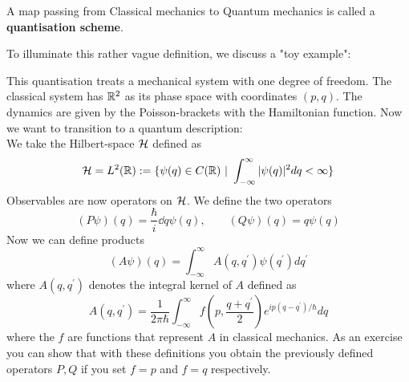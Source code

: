 \begin{definition}
  A map passing from Classical mechanics to Quantum mechanics is called a \textbf{quantisation scheme}.
\end{definition}

To illuminate this rather vague definition, we discuss a "toy example":

\begin{example}
  This quantisation treats a mechanical system with one degree of freedom. The classical system has $\mathbb{R}^2$ as its phase space with coordinates $(p,q)$. The dynamics are given by the Poisson-brackets with the Hamiltonian function. Now we want to transition to a quantum description:\\

  We take the Hilbert-space ${\mathcal{H}}$ defined as
  $$ {\mathcal{H}} = L^2(\mathbb{R}) := \{ \psi(q) \in C(\mathbb{R}) \ | \ \int_{-\infty}^\infty |\psi(q)|^2 dq < \infty  \} $$
  Observables are now operators on ${\mathcal{H}}$. We define the two operators
  $$ (P\psi)(q) = \frac{\hbar}{i} \dd{}{q} \psi(q), \quad \quad (Q\psi)(q) = q \psi(q) $$
  Now we can define products
  $$ (A\psi)(q) = \int_{-\infty}^\infty A(q,q^\prime) \psi(q^\prime) dq^\prime $$
  where $A(q,q^\prime)$ denotes the integral kernel of $A$ defined as
  $$ A(q,q^\prime) = \frac{1}{2 \pi \hbar} \int_{-\infty}^\infty f\left( p, \frac{q+q^\prime}{2} \right) e^{ip(q-q^\prime)/\hbar} dq $$
  where the $f$ are functions that represent $A$ in classical mechanics. As an exercise you can show that with these definitions you obtain the previously defined operators $P,Q$ if you set $f=p$ and $f=q$ respectively.\\


\end{example}
